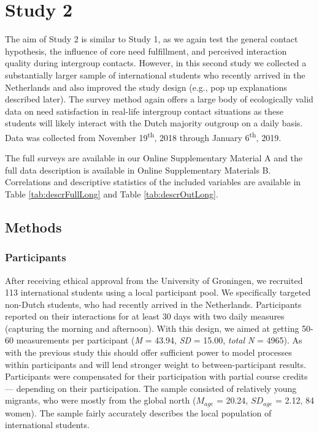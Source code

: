 \section{Study 2}

The aim of Study 2 is similar to Study 1, as we again test the general
contact hypothesis, the influence of core need fulfillment, and
perceived interaction quality during intergroup contacts. However, in
this second study we collected a substantially larger sample of
international students who recently arrived in the Netherlands and also
improved the study design (e.g., pop up explanations described later).
The survey method again offers a large body of ecologically valid data
on need satisfaction in real-life intergroup contact situations as these
students will likely interact with the Dutch majority outgroup on a
daily basis. Data was collected from November 19\textsuperscript{th},
2018 through January 6\textsuperscript{th}, 2019.

The full surveys are available in our Online Supplementary Material A
and the full data description is available in Online Supplementary
Materials B. Correlations and descriptive statistics of the included
variables are available in Table \ref{tab:descrFullLong} and Table
\ref{tab:descrOutLong}.

\subsection{Methods}

\subsubsection{Participants}

After receiving ethical approval from the University of Groningen, we
recruited 113 international students using a local participant pool. We
specifically targeted non-Dutch students, who had recently arrived in
the Netherlands. Participants reported on their interactions for at
least 30 days with two daily measures (capturing the morning and
afternoon). With this design, we aimed at getting 50-60 measurements per
participant (\textit{M} = 43.94, \textit{SD} = 15.00, \textit{total N} =
4965). As with the previous study this should offer sufficient power to
model processes within participants and will lend stronger weight to
between-participant results. Participants were compensated for their
participation with partial course credits --- depending on their
participation. The sample consisted of relatively young migrants, who
were mostly from the global north (\(M_{age}\) = 20.24, \(SD_{age}\) =
2.12, 84 women). The sample fairly accurately describes the local
population of international students.

